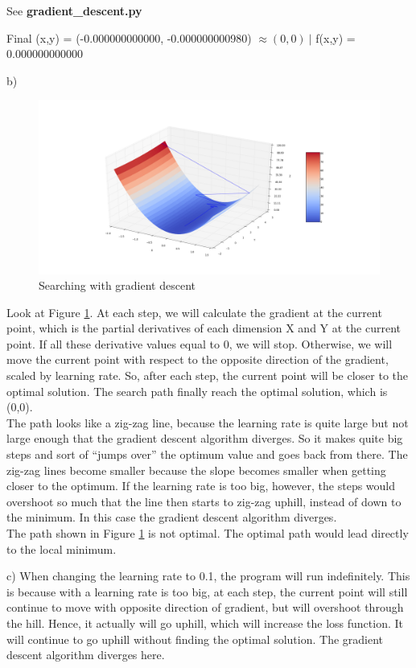 \documentclass{article}
\begin{document}
See \textbf{gradient\_descent.py}

Final (x,y) = (-0.000000000000, -0.000000000980) $\approx (0, 0)\ |$ f(x,y) = 0.000000000000

b)

\begin{figure}[h]
	\centering
	\includegraphics[scale=0.3]{gd.png}
	\caption{Searching with gradient descent}
	\label{fig3}
\end{figure}

Look at Figure \ref{fig3}. At each step, we will calculate the gradient at the current point, which is the partial derivatives of each dimension X and Y at the  current point. If all these derivative values equal to 0, we will stop. Otherwise, we will move the current point with respect to the opposite direction of the gradient, scaled by learning rate. So, after each step, the current point will be closer to the optimal solution. The search path finally reach the optimal solution, which is (0,0).\\
The path looks like a zig-zag line, because the learning rate is quite large but not large enough that the gradient descent algorithm diverges. So it makes quite big steps and sort of ``jumps over'' the optimum value and goes back from there. The zig-zag lines become smaller because the slope becomes smaller when getting closer to the optimum. If the learning rate is too big, however, the steps would overshoot so much that the line then starts to zig-zag uphill, instead of down to the minimum. In this case the gradient descent algorithm diverges.\\
The path shown in Figure \ref{fig3} is not optimal. The optimal path would lead directly to the local minimum.

c)
When changing the learning rate to 0.1, the program will run indefinitely. This is because with a learning rate is too big, at each step, the current point will still continue to move with opposite direction of gradient, but will overshoot through the hill. Hence, it actually will go uphill, which will increase the loss function. It will continue to go uphill without finding the optimal solution. The gradient descent algorithm diverges here.
\end{document}
